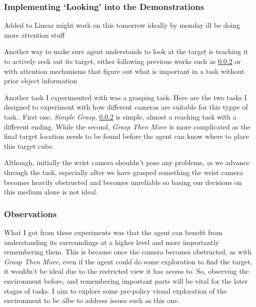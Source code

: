 \subsubsection{Implementing `Looking' into the Demonstrations}\label{ew-looking-at-target}
Added to Linear might work on this tomorrow ideally by monday ill be doing more attention stuff

Another way to make sure agent understands to look at the target is teaching it to actively seek out its target, either following previous works such as \ref{} or with attention mechanisms that figure out what is important in a task without prior object information 

Another task I experimented with was a grasping task. Here are the two tasks I designed to experiment with how different cameras are suitable for this typpe of task.. First one, \emph{Simple Grasp},  \ref{} is simple, almost a reaching task with a different ending. While the second, \emph{Grasp Then Move} is more complicated as the final target location needs to be found before the agent can know where to place this target cube.


Although, initially the wrist camera shouldn't pose any problems, as we advance through the task, especially after we have grasped something the wrist camera becomes heavily obstructed and becomes unreliable so basing our decisions on this medium alone is not ideal.

\subsubsection{Observations}
What I got from these experiments was that the agent can benefit from understanding its surroundings at a higher level and more importantly remembering them. This is because once the camera becomes obstructed, as with \emph{Grasp Then Move}, even if the agent could do some exploration to find the target, it wouldn't be ideal due to the restricted view it has access to. So, observing the environment before, and remembering important parts will be vital for the later stages of tasks. I aim to explore some pre-policy visual exploration of the environment to be albe to address issues such as this one.


